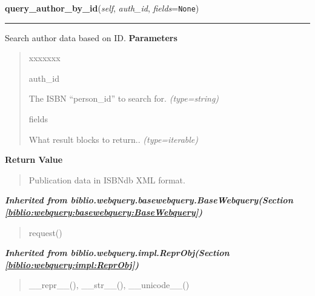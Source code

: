 \hspace{.8\funcindent}\begin{boxedminipage}{\funcwidth}

    \raggedright \textbf{query\_author\_by\_id}(\textit{self}, \textit{auth\_id}, \textit{fields}={\tt None})

    \vspace{-1.5ex}

    \rule{\textwidth}{0.5\fboxrule}
\setlength{\parskip}{2ex}

Search author data based on ID.
\setlength{\parskip}{1ex}
      \textbf{Parameters}
      \vspace{-1ex}

      \begin{quote}
        \begin{Ventry}{xxxxxxx}

          \item[auth\_id]


The ISBN ``person{\_}id'' to search for.
            {\it (type=string)}

          \item[fields]


What result blocks to return..
            {\it (type=iterable)}

        \end{Ventry}

      \end{quote}

      \textbf{Return Value}
    \vspace{-1ex}

      \begin{quote}

Publication data in ISBNdb XML format.
      \end{quote}

    \end{boxedminipage}


\large{\textbf{\textit{Inherited from biblio.webquery.basewebquery.BaseWebquery\textit{(Section \ref{biblio:webquery:basewebquery:BaseWebquery})}}}}

\begin{quote}
request()
\end{quote}

\large{\textbf{\textit{Inherited from biblio.webquery.impl.ReprObj\textit{(Section \ref{biblio:webquery:impl:ReprObj})}}}}

\begin{quote}
\_\_repr\_\_(), \_\_str\_\_(), \_\_unicode\_\_()
\end{quote}


